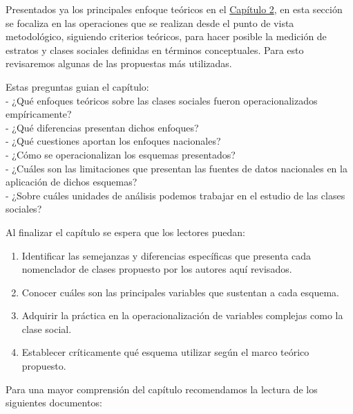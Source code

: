 \documentclass[
]{article}
\providecommand{\tightlist}{%
  \setlength{\itemsep}{0pt}\setlength{\parskip}{0pt}}
\begin{document}
Presentados ya los principales enfoque teóricos en el \protect\hyperlink{estructura1}{Capítulo 2}, en esta sección se focaliza en las operaciones que se realizan desde el punto de vista metodológico, siguiendo criterios teóricos, para hacer posible la medición de estratos y clases sociales definidas en términos conceptuales. Para esto revisaremos algunas de las propuestas más utilizadas.

Estas preguntas guian el capítulo:\\
- ¿Qué enfoques teóricos sobre las clases sociales fueron operacionalizados empíricamente?\\
- ¿Qué diferencias presentan dichos enfoques?\\
- ¿Qué cuestiones aportan los enfoques nacionales?\\
- ¿Cómo se operacionalizan los esquemas presentados?\\
- ¿Cuáles son las limitaciones que presentan las fuentes de datos nacionales en la aplicación de dichos esquemas?\\
- ¿Sobre cuáles unidades de análisis podemos trabajar en el estudio de las clases sociales?

Al finalizar el capítulo se espera que los lectores puedan:

\begin{enumerate}
\def\labelenumi{\arabic{enumi}.}
\tightlist
\item
  Identificar las semejanzas y diferencias específicas que presenta cada nomenclador de clases propuesto por los autores aquí revisados.
\item
  Conocer cuáles son las principales variables que sustentan a cada esquema.
\item
  Adquirir la práctica en la operacionalización de variables complejas como la clase social.
\item
  Establecer críticamente qué esquema utilizar según el marco teórico propuesto.
\end{enumerate}

Para una mayor comprensión del capítulo recomendamos la lectura de los siguientes documentos:
\end{document}
